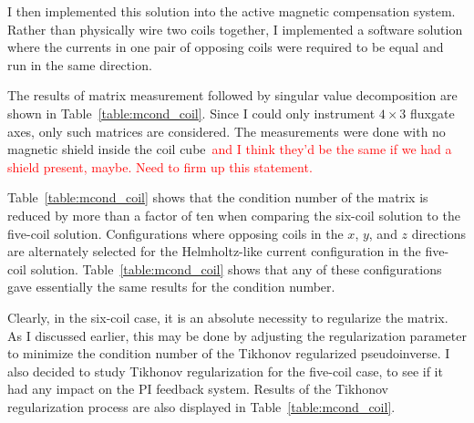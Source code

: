 I then implemented this solution into the active magnetic compensation
system.  Rather than physically wire two coils together, I implemented
a software solution where the currents in one pair of opposing coils
were required to be equal and run in the same direction.

The results of matrix measurement followed by singular value
decomposition are shown in Table~\ref{table:mcond_coil}.  Since I
could only instrument $4\times 3$ fluxgate axes, only such matrices
are considered.  The measurements were done with no magnetic shield
inside the coil cube~\textcolor{red}{and I think they'd be the same if
we had a shield present, maybe.  Need to firm up this statement.}

Table~\ref{table:mcond_coil} shows that the condition number of the
matrix is reduced by more than a factor of ten when comparing the
six-coil solution to the five-coil solution.  Configurations where
opposing coils in the $x$, $y$, and $z$ directions are alternately
selected for the Helmholtz-like current configuration in the five-coil
solution.  Table~\ref{table:mcond_coil} shows that any of these
configurations gave essentially the same results for the condition
number.

Clearly, in the six-coil case, it is an absolute necessity to
regularize the matrix.  As I discussed earlier, this may be done by
adjusting the regularization parameter to minimize the condition
number of the Tikhonov regularized pseudoinverse.  I also decided to
study Tikhonov regularization for the five-coil case, to see if it had
any impact on the PI feedback system.  Results of the Tikhonov
regularization process are also displayed in
Table~\ref{table:mcond_coil}.

